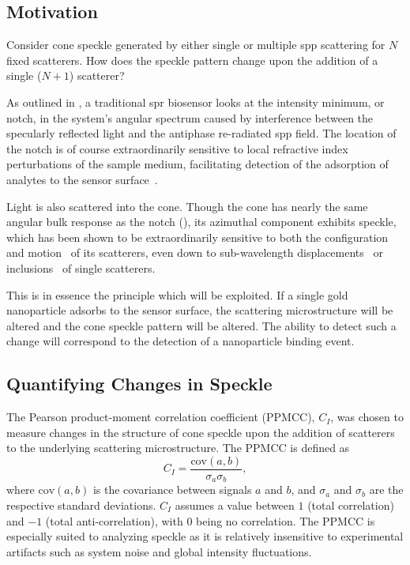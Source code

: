 \subsection{Motivation}
Consider cone speckle generated by either single or multiple \gls{spp} scattering
for $N$ fixed scatterers.  How does the speckle pattern change upon the
addition of a single ($N+1$) scatterer?

As outlined in , a traditional \gls{spr} biosensor looks at
the intensity minimum, or notch, in the system's angular spectrum caused by
interference between the specularly reflected light and the antiphase
re-radiated \gls{spp} field.  The location of the notch is of course
extraordinarily sensitive to local refractive index perturbations of the
sample medium, facilitating detection of the adsorption of analytes to the
sensor surface~\cite{homola1999surface}.

Light is also scattered into the cone.  Though the cone has nearly the same
angular bulk response as the notch (), its azimuthal
component exhibits speckle, which has been shown to be extraordinarily
sensitive to both the configuration and motion~\cite{berkovits1994correlations}
of its scatterers, even down to sub-wavelength
displacements~\cite{berkovits1991sensitivity} or
inclusions~\cite{berkovits1990theory} of single scatterers.

This is in essence the principle which will be exploited.  If a single gold
nanoparticle adsorbs to the sensor surface, the scattering microstructure will
be altered and the cone speckle pattern will be altered.  The ability to
detect such a change will correspond to the detection of a nanoparticle
binding event.

\subsection{Quantifying Changes in Speckle}
The Pearson product-moment correlation coefficient (PPMCC), $C_I$, was chosen
to measure changes in the structure of cone speckle upon the addition of
scatterers to the underlying scattering microstructure.  The PPMCC is defined
as
\begin{equation}
	C_I = \frac{\mathrm{cov}(a,b)}{\sigma_a \sigma_b},
	\label{eqn:pearsonproductmoment}
\end{equation}
where $\mathrm{cov}(a,b)$ is the covariance between signals $a$ and $b$,
and $\sigma_a$ and $\sigma_b$ are the respective standard deviations.  $C_I$
assumes a value between $1$ (total correlation) and $-1$ (total
anti-correlation), with $0$ being no correlation.
The PPMCC is especially suited to analyzing speckle as it is relatively
insensitive to experimental artifacts such as system noise and global
intensity fluctuations.

